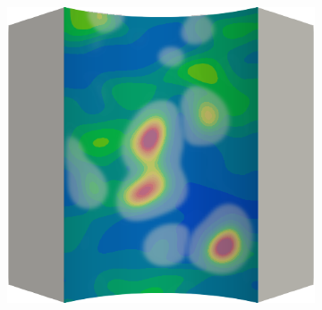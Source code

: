 \begin{frame}
\begin{columns}[T]
\begin{column}{0.6\textwidth}
\begin{figure}
{\begin{subfigure}{0.19\textwidth}
          \end{subfigure}
          \hspace{0.06\textwidth}
          \begin{subfigure}{0.19\textwidth}
            \centering
            \includegraphics[width=\textwidth]{Chapter345/figures/ep.0015}
          \end{subfigure}
        }
        

\end{figure}
\end{column}
\end{columns}
\end{frame}
